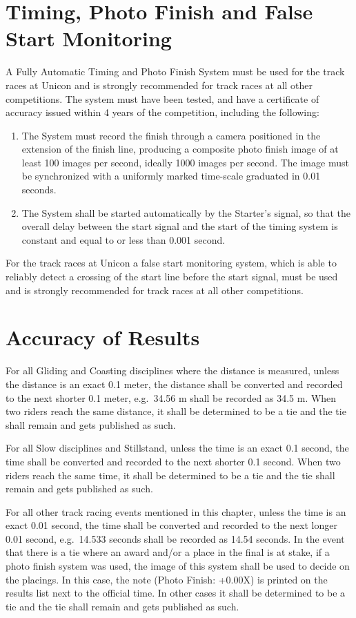 \section{Timing, Photo Finish and False Start Monitoring}

A Fully Automatic Timing and Photo Finish System must be used for the track races at Unicon and is strongly recommended for track races at all other competitions.
The system must have been tested, and have a certificate of accuracy issued within 4 years of the competition, including the following:
\begin{enumerate}
\item The System must record the finish through a camera positioned in the extension of the finish line, producing a composite photo finish image of at least 100 images per second, ideally 1000 images per second. The image must be synchronized with a uniformly marked time-scale graduated in 0.01 seconds.
\item The System shall be started automatically by the Starter’s signal, so that the overall delay between the start signal and the start of the timing system is constant and equal to or less than 0.001 second.
\end{enumerate}

For the track races at Unicon a false start monitoring system, which is able to reliably detect a crossing of the start line before the start signal, must be used and is strongly recommended for track races at all other competitions.

\section{Accuracy of Results}


For all Gliding and Coasting disciplines where the distance is measured, unless the distance is an exact 0.1 meter, the distance shall be converted and recorded to the next shorter 0.1 meter, e.g.\ 34.56 m shall be recorded as 34.5 m.
When two riders reach the same distance, it shall be determined to be a tie and the tie shall remain and gets published as such.

For all Slow disciplines and Stillstand, unless the time is an exact 0.1 second, the time shall be converted and recorded to the next shorter 0.1 second.
When two riders reach the same time, it shall be determined to be a tie and the tie shall remain and gets published as such.

For all other track racing events mentioned in this chapter, unless the time is an exact 0.01 second, the time shall be converted and recorded to the next longer 0.01 second, e.g.\ 14.533 seconds shall be recorded as 14.54 seconds.
In the event that there is a tie where an award and/or a place in the final is at stake, if a photo finish system was used, the image of this system shall be used to decide on the placings.
In this case, the note (Photo Finish: +0.00X) is printed on the results list next to the official time. In other cases it shall be determined to be a tie and the tie shall remain and gets published as such.


